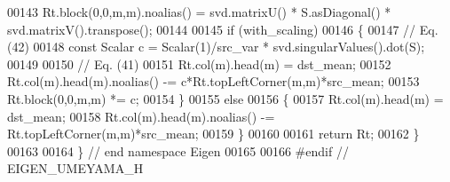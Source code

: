 \begin{DoxyCode}
00143   Rt.block(0,0,m,m).noalias() = svd.matrixU() * S.asDiagonal() * svd.matrixV().transpose();
00144 
00145   \textcolor{keywordflow}{if} (with\_scaling)
00146   \{
00147     \textcolor{comment}{// Eq. (42)}
00148     \textcolor{keyword}{const} Scalar c = Scalar(1)/src\_var * svd.singularValues().dot(S);
00149 
00150     \textcolor{comment}{// Eq. (41)}
00151     Rt.col(m).head(m) = dst\_mean;
00152     Rt.col(m).head(m).noalias() -= c*Rt.topLeftCorner(m,m)*src\_mean;
00153     Rt.block(0,0,m,m) *= c;
00154   \}
00155   \textcolor{keywordflow}{else}
00156   \{
00157     Rt.col(m).head(m) = dst\_mean;
00158     Rt.col(m).head(m).noalias() -= Rt.topLeftCorner(m,m)*src\_mean;
00159   \}
00160 
00161   \textcolor{keywordflow}{return} Rt;
00162 \}
00163 
00164 \} \textcolor{comment}{// end namespace Eigen}
00165 
00166 \textcolor{preprocessor}{#endif // EIGEN\_UMEYAMA\_H}
\end{DoxyCode}
